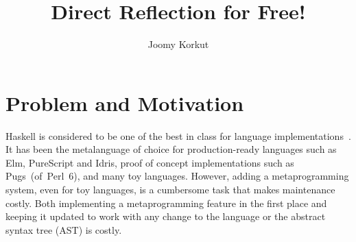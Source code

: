 \documentclass[format=acmsmall, review=false, screen=true]{acmart}
\newcommand{\lam}{\texorpdfstring{\textlambda}{lambda}}
\newcommand{\Lam}{\texorpdfstring{\textlambda}{Lambda}}
\begin{document}
\title{Direct Reflection for Free!}
\subtitle{}

\author{Joomy Korkut}

\renewcommand{\shortauthors}{Joomy Korkut}

\newcommand{\lc}{\mbox{\lam-calculus}}
\newcommand{\Lc}{\mbox{\Lam-calculus}}





\maketitle
\thispagestyle{empty}


\section{Problem and Motivation}

Haskell is considered to be one of the best in class for language implementations~\cite{sotu}.
It has been the metalanguage of choice for production-ready languages such as Elm, PureScript and Idris, proof of concept implementations such as \mbox{Pugs (of Perl 6)}, and many toy languages.
However, adding a metaprogramming system, even for toy languages, is a cumbersome task that makes maintenance costly.
Both implementing a metaprogramming feature in the first place and keeping it updated to work with any change to the language or the abstract syntax tree (AST) is costly.
\end{document}
